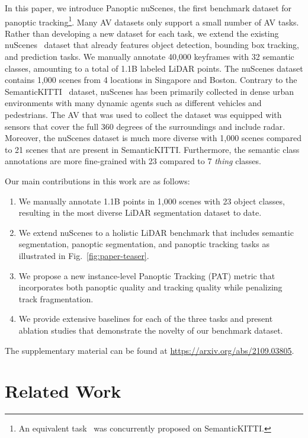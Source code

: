 \documentclass[letterpaper, 10 pt, journal, twoside]{IEEEtran}
\newcommand{\figref}[1]{Fig.~\ref{#1}}
\newcommand{\newmet}{PAT}
\begin{document}
In this paper, we introduce Panoptic nuScenes, the first benchmark dataset for panoptic tracking\footnote[2]{An equivalent task~\cite{aygun20214d} was concurrently proposed on SemanticKITTI.}.
Many AV datasets only support a small number of AV tasks. Rather than developing a new dataset for each task, we extend the existing nuScenes~\cite{caesar2020nuscenes} dataset that already features object detection, bounding box tracking, and prediction tasks. We manually annotate 40,000 keyframes with 32 semantic classes, amounting to a total of 1.1B labeled LiDAR points.
The nuScenes dataset contains 1,000 scenes from 4 locations in Singapore and Boston. Contrary to the SemanticKITTI~\cite{behley2019semantickitti} dataset, nuScenes has been primarily collected in dense urban environments with many dynamic agents such as different vehicles and pedestrians. The AV that was used to collect the dataset was equipped with sensors that cover the full 360 degrees of the surroundings and include radar. Moreover, the nuScenes dataset is much more diverse with 1,000 scenes compared to 21 scenes that are present in SemanticKITTI. Furthermore, the semantic class annotations are more fine-grained with 23 compared to 7 \emph{thing} classes.

Our main contributions in this work are as follows:
\begin{enumerate}[topsep=0pt]
    \item We manually annotate 1.1B points in 1,000 scenes with 23 object classes, resulting in the most diverse LiDAR segmentation dataset to date.
    \item We extend nuScenes to a holistic LiDAR benchmark that includes semantic segmentation, panoptic segmentation, and panoptic tracking tasks as illustrated in \figref{fig:paper-teaser}.
    \item We propose a new instance-level Panoptic Tracking (\newmet) metric that incorporates both panoptic quality and tracking quality while penalizing track fragmentation.
    \item We provide extensive baselines for each of the three tasks and present ablation studies that demonstrate the novelty of our benchmark dataset.
\end{enumerate}

The supplementary material can be found at \url{https://arxiv.org/abs/2109.03805}. 
\section{Related Work}
\label{sec:relatedWork}
\end{document}
